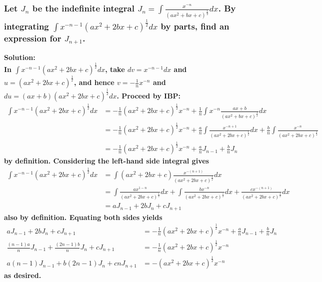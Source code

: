 \documentclass{article}
\begin{document}
\subsubsection*{Let $J_n$ be the indefinite integral $J_n = \int \frac{x^{-n}}{(ax^2+bx+c)^{\frac{1}{2}}} dx$. By integrating $\int x^{-n-1}(ax^2+2bx+c)^{\frac{1}{2}} dx$ by parts, find an expression for $J_{n+1}$.}
\bf Solution: \\
\normalfont In $ \int x^{-n-1}(ax^2+2bx+c)^{\frac{1}{2}} dx$, take $dv = x^{-n-1} dx$ and $u = (ax^2+2bx+c)^{\frac{1}{2}}$, and hence $v = -\frac{1}{n}x^{-n}$ and $du = (ax+b)(ax^2+2bx+c)^{\frac{1}{2}} dx$. Proceed by IBP:
\begin{equation*}
    \begin{aligned}
        \int x^{-n-1} (ax^2+2bx+c)^{\frac{1}{2}} dx &= -\frac{1}{n}(ax^2+2bx+c)^{\frac{1}{2}}x^{-n} + \frac{1}{n}\int x^{-n} \frac{ax+b}{(ax^2+bx+c)^{\frac{1}{2}}}dx \\
        &= -\frac{1}{n}(ax^2+2bx+c)^{\frac{1}{2}}x^{-n} + \frac{a}{n}\int \frac{x^{-n+1}}{(ax^2+2bx+c)^{\frac{1}{2}}} dx + \frac{b}{n}\int \frac{x^{-n}}{(ax^2+2bx+c)^{\frac{1}{2}}} \\
        &= -\frac{1}{n}(ax^2+2bx+c)^{\frac{1}{2}}x^{-n} + \frac{a}{n}J_{n-1} + \frac{b}{n}J_n
    \end{aligned}
\end{equation*}
by definition. Considering the left-hand side integral gives
\begin{equation*}
    \begin{aligned}
        \int x^{-n-1} (ax^2+2bx+c)^{\frac{1}{2}} dx &= \int (ax^2+2bx+c)\frac{x^{-(n+1)}}{(ax^2+2bx+c)^{\frac{1}{2}}} dx \\
        &= \int \frac{ax^{1-n}}{(ax^2+2bx+c)^{\frac{1}{2}}} dx + \int \frac{bx^{-n}}{(ax^2+2bx+c)^{\frac{1}{2}}} dx + \frac{cx^{-(n+1)}}{(ax^2+2bx+c)^{\frac{1}{2}}} dx \\
        &= aJ_{n-1} + 2bJ_n + cJ_{n+1}
    \end{aligned}
\end{equation*}
also by definition. Equating both sides yields
\begin{equation*}
    \begin{aligned}
         aJ_{n-1} + 2bJ_n + cJ_{n+1} &= -\frac{1}{n}(ax^2+2bx+c)^{\frac{1}{2}}x^{-n} + \frac{a}{n}J_{n-1} + \frac{b}{n}J_n \\
         \frac{(n-1)a}{n}J_{n-1} + \frac{(2n-1)b}{n}J_n + cJ_{n+1} &= -\frac{1}{n}(ax^2+2bx+c)^{\frac{1}{2}}x^{-n} \\
         a(n-1)J_{n-1} + b(2n-1)J_n + cnJ_{n+1} &= -(ax^2+2bx+c)^{\frac{1}{2}}x^{-n}
    \end{aligned}
\end{equation*}
as desired.
\end{document}
